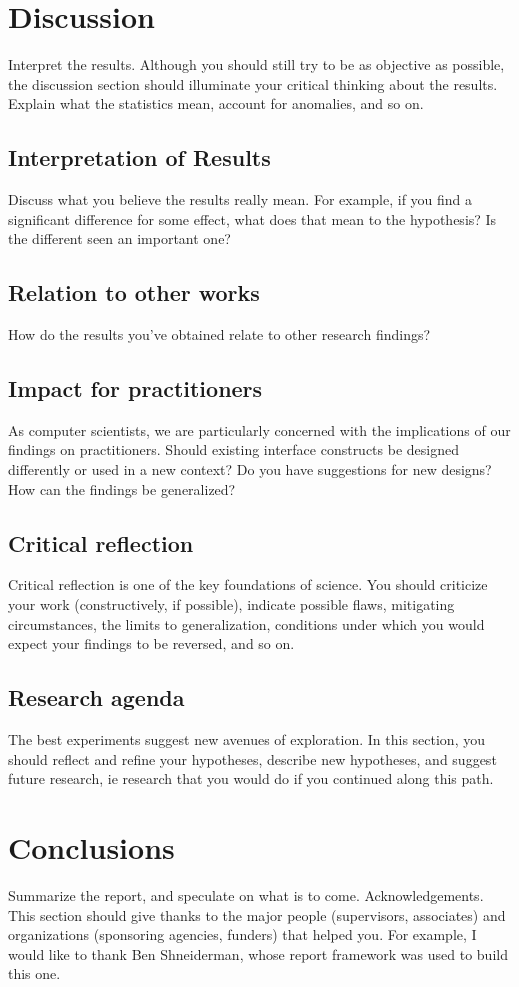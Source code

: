 \section{Discussion}
Interpret the results. Although you should still try to be as objective as possible, the discussion section should illuminate your critical thinking about the results. Explain what the statistics mean, account for anomalies, and so on.
\subsection{Interpretation of Results}
Discuss what you believe the results really mean. For example, if you find a significant difference for some effect, what does that mean to the hypothesis? Is the different seen an important one?
\subsection{Relation to other works}
How do the results you’ve obtained relate to other research findings?
\subsection{Impact for practitioners}
As computer scientists, we are particularly concerned with the implications of our findings on practitioners. Should existing interface constructs be designed differently or used in a new context? Do you have suggestions for new designs? How can the findings be generalized?
\subsection{Critical reflection}
Critical reflection is one of the key foundations of science. You should criticize your work (constructively, if possible), indicate possible flaws, mitigating circumstances, the limits to generalization, conditions under which you would expect your findings to be reversed, and so on.
\subsection{Research agenda}
The best experiments suggest new avenues of exploration. In this section, you should reflect and refine your hypotheses, describe new hypotheses, and suggest future research, ie research that you would do if you continued along this path.
\section{Conclusions}
Summarize the report, and speculate on what is to come.
Acknowledgements. This section should give thanks to the major people (supervisors, associates) and organizations (sponsoring agencies, funders) that helped you. For example, I would like to thank Ben Shneiderman, whose report framework was used to build this one.